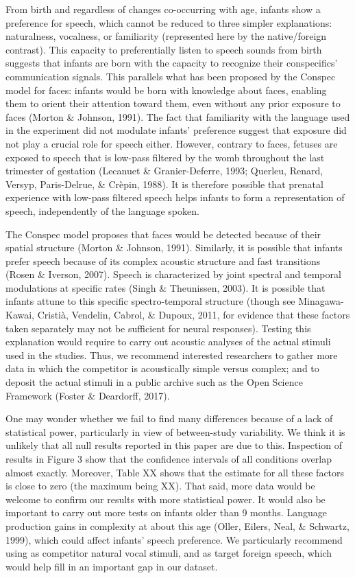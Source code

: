 \documentclass[man]{apa6}
\begin{document}
From birth and regardless of changes co-occurring with age, infants show
a preference for speech, which cannot be reduced to three simpler
explanations: naturalness, vocalness, or familiarity (represented here
by the native/foreign contrast). This capacity to preferentially listen
to speech sounds from birth suggests that infants are born with the
capacity to recognize their conspecifics' communication signals. This
parallels what has been proposed by the Conspec model for faces: infants
would be born with knowledge about faces, enabling them to orient their
attention toward them, even without any prior exposure to faces (Morton
\& Johnson, 1991). The fact that familiarity with the language used in
the experiment did not modulate infants' preference suggest that
exposure did not play a crucial role for speech either. However,
contrary to faces, fetuses are exposed to speech that is low-pass
filtered by the womb throughout the last trimester of gestation
(Lecanuet \& Granier-Deferre, 1993; Querleu, Renard, Versyp,
Paris-Delrue, \& Crèpin, 1988). It is therefore possible that prenatal
experience with low-pass filtered speech helps infants to form a
representation of speech, independently of the language spoken.

The Conspec model proposes that faces would be detected because of their
spatial structure (Morton \& Johnson, 1991). Similarly, it is possible
that infants prefer speech because of its complex acoustic structure and
fast transitions (Rosen \& Iverson, 2007). Speech is characterized by
joint spectral and temporal modulations at specific rates (Singh \&
Theunissen, 2003). It is possible that infants attune to this specific
spectro-temporal structure (though see Minagawa-Kawai, Cristià,
Vendelin, Cabrol, \& Dupoux, 2011, for evidence that these factors taken
separately may not be sufficient for neural responses). Testing this
explanation would require to carry out acoustic analyses of the actual
stimuli used in the studies. Thus, we recommend interested researchers
to gather more data in which the competitor is acoustically simple
versus complex; and to deposit the actual stimuli in a public archive
such as the Open Science Framework (Foster \& Deardorff, 2017).

One may wonder whether we fail to find many differences because of a
lack of statistical power, particularly in view of between-study
variability. We think it is unlikely that all null results reported in
this paper are due to this. Inspection of results in Figure 3 show that
the confidence intervals of all conditions overlap almost exactly.
Moreover, Table XX shows that the estimate for all these factors is
close to zero (the maximum being XX). That said, more data would be
welcome to confirm our results with more statistical power. It would
also be important to carry out more tests on infants older than 9
months. Language production gains in complexity at about this age
(Oller, Eilers, Neal, \& Schwartz, 1999), which could affect infants'
speech preference. We particularly recommend using as competitor natural
vocal stimuli, and as target foreign speech, which would help fill in an
important gap in our dataset.
\end{document}
